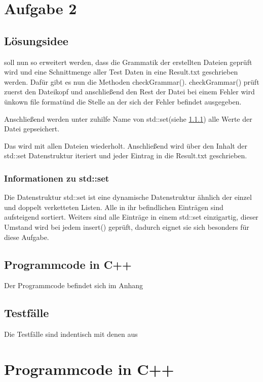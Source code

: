 \documentclass[10pt,a4paper, parskip=half]{scrartcl}
\begin{document}
\newpage
\section{Aufgabe 2}

\subsection{L\"{o}sungsidee}
 soll nun so erweitert werden, dass die Grammatik der erstellten Dateien geprüft wird und eine Schnittmenge aller 
Test Daten in eine Result.txt geschrieben werden.
Dafür gibt es nun die Methoden checkGrammar().
checkGrammar() prüft zuerst den Dateikopf und anschließend den Rest der Datei bei einem Fehler wird \"unkown file format\" und die Stelle
an der sich der Fehler befindet ausgegeben.

Anschließend werden unter zuhilfe Name von std::set(siehe \ref{subsubsec:Set}) alle Werte der Datei gepseichert. 

Das wird mit allen Dateien wiederholt.
Anschließend wird über den Inhalt der std::set Datenstruktur iteriert und jeder Eintrag in die Result.txt geschrieben.

\subsubsection{Informationen zu std::set}
\label{subsubsec:Set}

Die Datenstruktur std::set ist eine dynamische Datenstruktur ähnlich der einzel und doppelt verketteten Listen.
Alle in ihr befindlichen Einträgen sind aufsteigend sortiert.
\newline Weiters sind alle Einträge in einem std::set einzigartig, dieser Umstand wird bei jedem insert() geprüft, dadurch eignet sie sich
besonders für diese Aufgabe.

\subsection{Programmcode in C++}

Der Programmcode befindet sich im Anhang

\subsection{Testf\"{a}lle}
Die Testfälle sind indentisch mit denen aus 

\newpage
\appendix
\section{Programmcode in C++}
\end{document}

